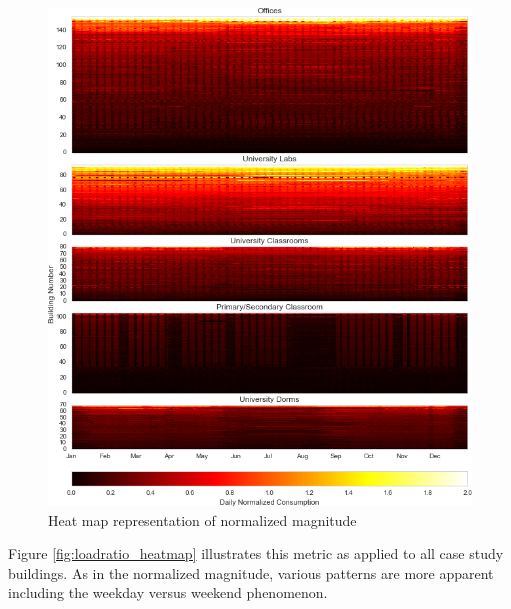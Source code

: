 \begin{figure}[ht!]
\begin{center}
\includegraphics[width=1\columnwidth]{figures/normalizedcons_heatmap/normalizedcons_heatmap}
\caption{Heat map representation of normalized magnitude
\label{fig:normalizedcons_heatmap}%
}
\end{center}
\end{figure}

Figure \ref{fig:loadratio_heatmap} illustrates this metric as applied to all case study buildings. As in the normalized magnitude, various patterns are more apparent including the weekday versus weekend phenomenon.

